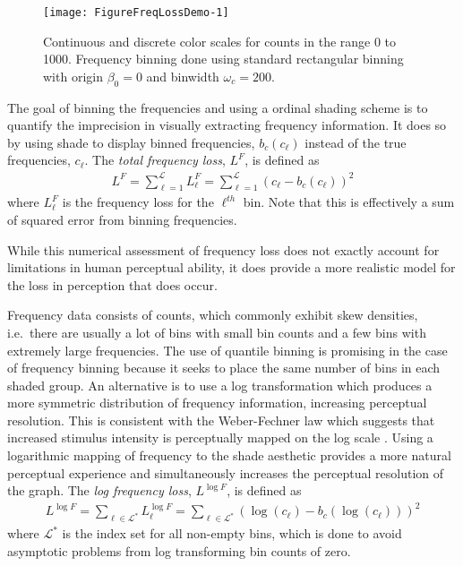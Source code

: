 \documentclass[11pt]{isuthesis}\usepackage[]{graphicx}\usepackage[]{color}
\newenvironment{knitrout}{}{} %
\begin{document}
\begin{knitrout}
\color{fgcolor}\begin{figure}[h]

{\centering \texttt{[image: FigureFreqLossDemo-1]} 

}

\caption[Continuous and discrete color scales for counts in the range 0 to 1000]{Continuous and discrete color scales for counts in the range 0 to 1000. Frequency binning done using  standard rectangular binning with origin $\beta_0 = 0$ and binwidth $\omega_c = 200$. }\label{fig:FreqLossDemo}
\end{figure}


\end{knitrout}

 
The goal of binning the frequencies and using a ordinal shading scheme is to quantify the imprecision in visually extracting frequency information. It does so by using shade to display binned frequencies, $b_c(c_\ell)$ instead of the true frequencies, $c_\ell$. The \textit{total frequency loss}, $L^F$, is defined as
%
\begin{eqnarray}\label{totfreqloss}
L^F = \sum_{\ell=1}^{\mathscr{L}} L_\ell^F = \sum_{\ell=1}^{\mathscr{L}} (c_\ell-b_c(c_\ell))^2
\end{eqnarray}  
%
where $L_\ell^F$ is the frequency loss for the $\ell^{th}$ bin. Note that this is effectively a sum of squared error from binning frequencies.

While this numerical assessment of frequency loss does not exactly account for limitations in human perceptual ability, it does provide a more realistic model for the loss in perception that does occur.

Frequency data consists of counts, which commonly exhibit skew densities, i.e.\ there are usually a lot of bins with small bin counts and a few bins with extremely large frequencies. The use of quantile binning is promising in the case of frequency binning because it seeks to place the same number of bins in each shaded group. An alternative is to use a log transformation which produces a more symmetric distribution of frequency information, increasing perceptual resolution. This is consistent with the Weber-Fechner law which suggests that increased stimulus intensity is perceptually mapped on the log scale \citep{sp}. Using a logarithmic mapping of frequency to the shade aesthetic provides a more natural perceptual experience and simultaneously increases the perceptual resolution of the graph. The \textit{log frequency loss}, $L^{\log F}$, is defined as
%
\begin{eqnarray}\label{logfrequency}
L^{\log F} = \sum_{\ell \in \mathscr{L}^\ast} L_\ell^{\log F} = \sum_{\ell \in \mathscr{L}^\ast} (\log(c_\ell) - b_c(\log(c_\ell)))^2
\end{eqnarray}
%
where $\mathscr{L}^\ast$ is the index set for all non-empty bins, which is done to avoid asymptotic problems from log transforming bin counts of zero. 
\end{document}
